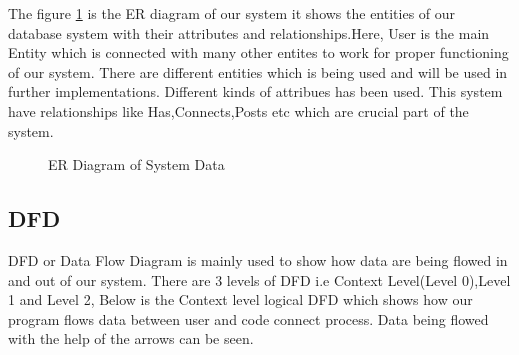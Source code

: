 The figure \ref{ER} is the ER diagram of our system it shows the entities of our database system with their attributes and relationships.Here, User is the main Entity which is connected with many other entites to work for proper functioning of our system. There are different entities which is being used and will be used in further implementations. Different kinds of attribues has been used. This system have relationships like Has,Connects,Posts etc which are crucial part of the system.
\begin{figure}[H]
  \centering
    \caption{ER Diagram of System Data}
    \label{ER}
\end{figure}
\newpage
\subsection{DFD}
DFD or Data Flow Diagram is mainly used to show how data are being flowed in and out of our system. There are 3 levels of DFD i.e Context Level(Level 0),Level 1 and Level 2, Below is the Context level logical DFD which shows how our program flows data between user and code connect process. Data being flowed with the help of the arrows can be seen.

